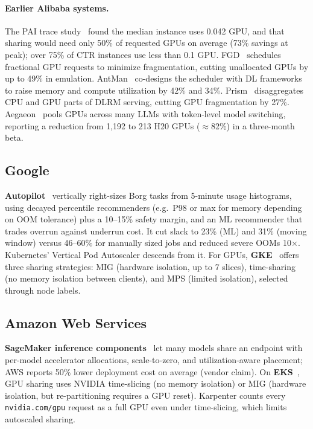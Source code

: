 \paragraph{Earlier Alibaba systems.} The PAI trace study~\cite{weng2022mlaas} found the median instance uses 0.042 GPU, and that sharing would need only 50\% of requested GPUs on average (73\% savings at peak); over 75\% of CTR instances use less than 0.1 GPU. FGD~\cite{weng2023fgd} schedules fractional GPU requests to minimize fragmentation, cutting unallocated GPUs by up to 49\% in emulation. AntMan~\cite{xiao2020antman} co-designs the scheduler with DL frameworks to raise memory and compute utilization by 42\% and 34\%. Prism~\cite{yang2025prism} disaggregates CPU and GPU parts of DLRM serving, cutting GPU fragmentation by 27\%. Aegaeon~\cite{xiang2025aegaeon} pools GPUs across many LLMs with token-level model switching, reporting a reduction from 1{,}192 to 213 H20 GPUs ($\approx$82\%) in a three-month beta.

\subsection{Google}
\textbf{Autopilot}~\cite{rzadca2020autopilot} vertically right-sizes Borg tasks from 5-minute usage histograms, using decayed percentile recommenders (e.g.\ P98 or max for memory depending on OOM tolerance) plus a 10--15\% safety margin, and an ML recommender that trades overrun against underrun cost. It cut slack to 23\% (ML) and 31\% (moving window) versus 46--60\% for manually sized jobs and reduced severe OOMs 10$\times$. Kubernetes' Vertical Pod Autoscaler descends from it. For GPUs, \textbf{GKE}~\cite{gke2026sharing} offers three sharing strategies: MIG (hardware isolation, up to 7 slices), time-sharing (no memory isolation between clients), and MPS (limited isolation), selected through node labels.

\subsection{Amazon Web Services}
\textbf{SageMaker inference components}~\cite{aws2023sagemaker} let many models share an endpoint with per-model accelerator allocations, scale-to-zero, and utilization-aware placement; AWS reports 50\% lower deployment cost on average (vendor claim). On \textbf{EKS}~\cite{aws2026eks}, GPU sharing uses NVIDIA time-slicing (no memory isolation) or MIG (hardware isolation, but re-partitioning requires a GPU reset). Karpenter counts every \texttt{nvidia.com/gpu} request as a full GPU even under time-slicing, which limits autoscaled sharing.

